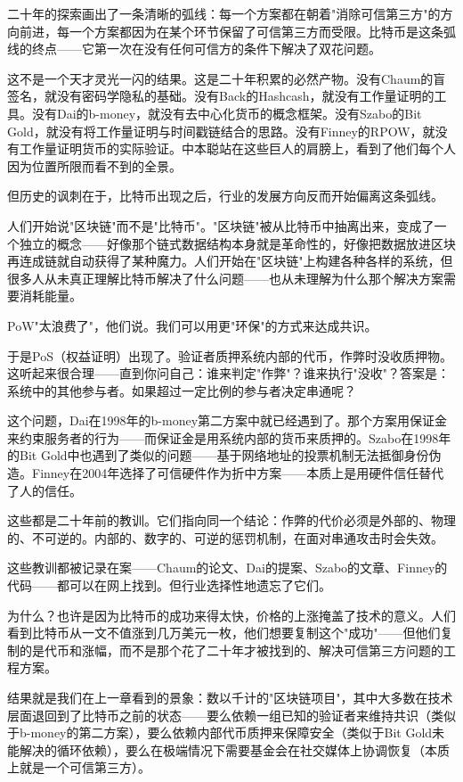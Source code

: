 \documentclass[a4paper,12pt,openany]{ctexbook}
\begin{document}
二十年的探索画出了一条清晰的弧线：每一个方案都在朝着"消除可信第三方"的方向前进，每一个方案都因为在某个环节保留了可信第三方而受限。比特币是这条弧线的终点——它第一次在没有任何可信方的条件下解决了双花问题。

这不是一个天才灵光一闪的结果。这是二十年积累的必然产物。没有Chaum的盲签名，就没有密码学隐私的基础。没有Back的Hashcash，就没有工作量证明的工具。没有Dai的b-money，就没有去中心化货币的概念框架。没有Szabo的Bit Gold，就没有将工作量证明与时间戳链结合的思路。没有Finney的RPOW，就没有工作量证明货币的实际验证。中本聪站在这些巨人的肩膀上，看到了他们每个人因为位置所限而看不到的全景。

但历史的讽刺在于，比特币出现之后，行业的发展方向反而开始偏离这条弧线。

人们开始说"区块链"而不是"比特币"。"区块链"被从比特币中抽离出来，变成了一个独立的概念——好像那个链式数据结构本身就是革命性的，好像把数据放进区块再连成链就自动获得了某种魔力。人们开始在"区块链"上构建各种各样的系统，但很多人从未真正理解比特币解决了什么问题——也从未理解为什么那个解决方案需要消耗能量。

PoW"太浪费了"，他们说。我们可以用更"环保"的方式来达成共识。

于是PoS（权益证明）出现了。验证者质押系统内部的代币，作弊时没收质押物。这听起来很合理——直到你问自己：谁来判定"作弊"？谁来执行"没收"？答案是：系统中的其他参与者。如果超过一定比例的参与者决定串通呢？

这个问题，Dai在1998年的b-money第二方案中就已经遇到了。那个方案用保证金来约束服务者的行为——而保证金是用系统内部的货币来质押的。Szabo在1998年的Bit Gold中也遇到了类似的问题——基于网络地址的投票机制无法抵御身份伪造。Finney在2004年选择了可信硬件作为折中方案——本质上是用硬件信任替代了人的信任。

这些都是二十年前的教训。它们指向同一个结论：作弊的代价必须是外部的、物理的、不可逆的。内部的、数字的、可逆的惩罚机制，在面对串通攻击时会失效。

这些教训都被记录在案——Chaum的论文、Dai的提案、Szabo的文章、Finney的代码——都可以在网上找到。但行业选择性地遗忘了它们。

为什么？也许是因为比特币的成功来得太快，价格的上涨掩盖了技术的意义。人们看到比特币从一文不值涨到几万美元一枚，他们想要复制这个"成功"——但他们复制的是代币和涨幅，而不是那个花了二十年才被找到的、解决可信第三方问题的工程方案。

结果就是我们在上一章看到的景象：数以千计的"区块链项目"，其中大多数在技术层面退回到了比特币之前的状态——要么依赖一组已知的验证者来维持共识（类似于b-money的第二方案），要么依赖内部代币质押来保障安全（类似于Bit Gold未能解决的循环依赖），要么在极端情况下需要基金会在社交媒体上协调恢复（本质上就是一个可信第三方）。
\end{document}
